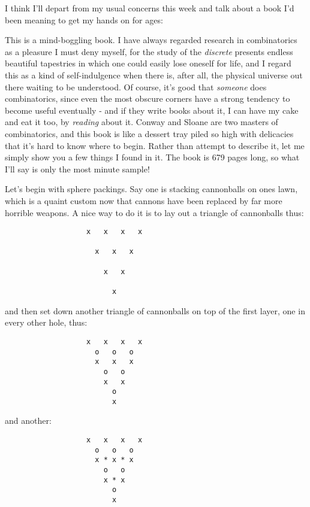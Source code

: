
I think I'll depart from my usual concerns this week and talk about a book I'd been meaning to get my hands on for ages:


This is a mind-boggling book. I have always regarded research in combinatorics as a pleasure I must deny myself, for the study of the \emph{discrete} presents endless beautiful tapestries in which one could easily lose oneself for life, and I regard this as a kind of self-indulgence when there is, after all, the physical universe out there waiting to be understood. Of course, it's good that \emph{someone} does combinatorics, since even the most obscure corners have a strong tendency to become useful eventually - and if they write books about it, I can have my cake and eat it too, by \emph{reading} about it. Conway and Sloane are two masters of combinatorics, and this book is like a dessert tray piled so high with delicacies that it's hard to know where to begin. Rather than attempt to describe it, let me simply show you a few things I found in it. The book is 679 pages long, so what I'll say is only the most minute sample!

Let's begin with sphere packings. Say one is stacking cannonballs on ones lawn, which is a quaint custom now that cannons have been replaced by far more horrible weapons. A nice way to do it is to lay out a triangle of cannonballs thus:
\begin{verbatim}
                   x   x   x   x

                     x   x   x

                       x   x

                         x
\end{verbatim}
and then set down another triangle of cannonballs on top of the first layer, one in every other hole, thus:
\begin{verbatim}
                   x   x   x   x
                     o   o   o
                     x   x   x
                       o   o
                       x   x
                         o
                         x
\end{verbatim}

and another:
\begin{verbatim}
                   x   x   x   x
                     o   o   o
                     x * x * x
                       o   o
                       x * x
                         o
                         x
\end{verbatim}

